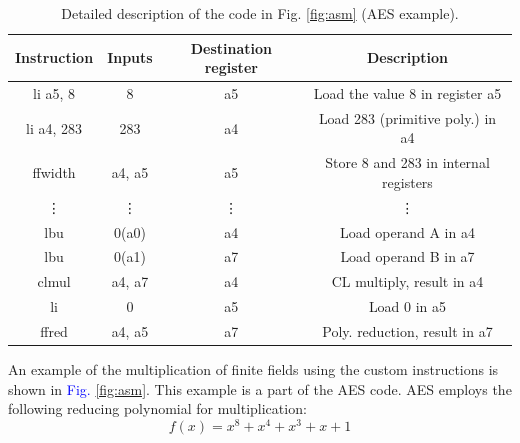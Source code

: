 \begin{table}[tp]
    \begin{tabular}{
    >{\columncolor[HTML]{EFEFEF}}c ccc}
    \cellcolor[HTML]{C0C0C0}Instruction          & \cellcolor[HTML]{C0C0C0}Inputs & \cellcolor[HTML]{C0C0C0}Destination register & \cellcolor[HTML]{C0C0C0}Description   \\ \hline
    li a5, 8                                     & 8                              & a5                                           & Load the value 8 in register a5       \\
    li a4, 283                                   & 283                            & a4                                           & Load 283 (primitive poly.) in a4      \\
    ffwidth                                      & a4, a5                         & a5                                           & Store 8 and 283 in internal registers \\
    \vdots & \vdots           & \vdots                         & \vdots                  \\
    lbu                                          & 0(a0)                          & a4                                           & Load operand A in a4                  \\
    lbu                                          & 0(a1)                          & a7                                           & Load operand B in a7                  \\
    clmul                                        & a4, a7                         & a4                                           & CL multiply, result in a4             \\
    li                                           & 0                              & a5                                           & Load 0 in a5                          \\
    ffred                                        & a4, a5                         & a7                                           & Poly. reduction, result in a7        
    \end{tabular}
    \caption{Detailed description of the code in Fig. \ref{fig:asm} (AES example).}
    \label{tab:detail}
\end{table}

An example of the multiplication of finite fields using the custom instructions is shown in \textcolor{blue}{Fig.} \ref{fig:asm}. 
This example is a part of the AES code. AES employs the following reducing polynomial for multiplication:
\begin{equation}
    f(x) = x^{8} + x^{4} + x^{3} + x + 1
    \label{eq:aes}
\end{equation}

